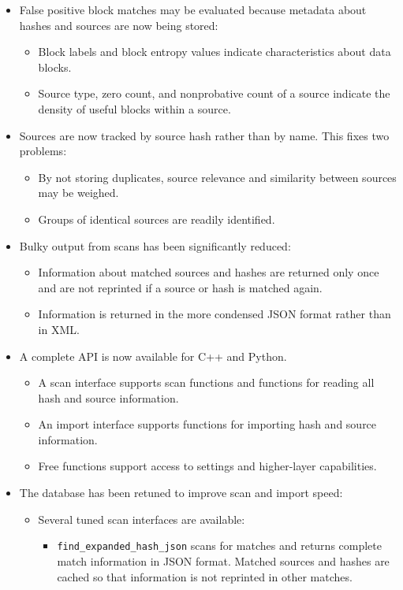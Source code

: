 \documentclass[11pt,fleqn]{article} %
\begin{document}
\begin{itemize}
\item False positive block matches may be evaluated because metadata about hashes and sources are now being stored:
  \begin{itemize}
  \item Block labels and block entropy values indicate characteristics about data blocks.
  \item Source type, zero count, and nonprobative count of a source indicate the density of useful blocks within a source.
\end{itemize}
\item Sources are now tracked by source hash rather than by name.  This fixes two problems:
  \begin{itemize}
  \item By not storing duplicates, source relevance and similarity between sources may be weighed.
  \item Groups of identical sources are readily identified.
  \end{itemize}
\item Bulky output from scans has been significantly reduced:
  \begin{itemize}
  \item Information about matched sources and hashes are returned only once and are not reprinted if a source or hash is matched again.
  \item Information is returned in the more condensed JSON format rather than in XML.
  \end{itemize}
\item A complete \hdb API is now available for C++ and Python.
  \begin{itemize}
  \item A scan interface supports scan functions and functions for reading all hash and source information.
  \item An import interface supports functions for importing hash and source information.
  \item Free functions support access to settings and higher-layer capabilities.
  \end{itemize}
\item The database has been retuned to improve scan and import speed:
  \begin{itemize}
  \item Several tuned scan interfaces are available:
    \begin{itemize}
    \item \verb+find_expanded_hash_json+ scans for matches and returns complete match information in JSON format.  Matched sources and hashes are cached so that information is not reprinted in other matches.

\end{itemize}
\end{itemize}
\end{itemize}
\end{document}
